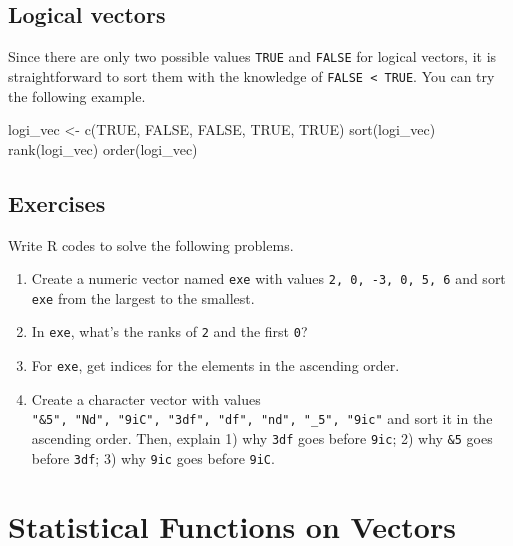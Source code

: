 \documentclass[
]{book}
\newenvironment{Shaded}{\begin{snugshade}}{\end{snugshade}}
\newcommand{\ConstantTok}[1]{\textcolor[rgb]{0.00,0.00,0.00}{#1}}
\newcommand{\FunctionTok}[1]{\textcolor[rgb]{0.00,0.00,0.00}{#1}}
\newcommand{\NormalTok}[1]{#1}
\newcommand{\OtherTok}[1]{\textcolor[rgb]{0.56,0.35,0.01}{#1}}
\begin{document}
\hypertarget{logical-vectors}{%
\subsection{Logical vectors}\label{logical-vectors}}

Since there are only two possible values \texttt{TRUE} and \texttt{FALSE} for logical vectors, it is straightforward to sort them with the knowledge of \texttt{FALSE\ \textless{}\ TRUE}. You can try the following example.

\begin{Shaded}
\begin{Highlighting}[]
\NormalTok{logi\_vec }\OtherTok{\textless{}{-}} \FunctionTok{c}\NormalTok{(}\ConstantTok{TRUE}\NormalTok{, }\ConstantTok{FALSE}\NormalTok{, }\ConstantTok{FALSE}\NormalTok{, }\ConstantTok{TRUE}\NormalTok{, }\ConstantTok{TRUE}\NormalTok{)}
\FunctionTok{sort}\NormalTok{(logi\_vec)}
\FunctionTok{rank}\NormalTok{(logi\_vec)}
\FunctionTok{order}\NormalTok{(logi\_vec)}
\end{Highlighting}
\end{Shaded}

\hypertarget{exercises-6}{%
\subsection{Exercises}\label{exercises-6}}

Write R codes to solve the following problems.

\begin{enumerate}
\def\labelenumi{\arabic{enumi}.}
\item
  Create a numeric vector named \texttt{exe} with values \texttt{2,\ 0,\ -3,\ 0,\ 5,\ 6} and sort \texttt{exe} from the largest to the smallest.
\item
  In \texttt{exe}, what's the ranks of \texttt{2} and the first \texttt{0}?
\item
  For \texttt{exe}, get indices for the elements in the ascending order.
\item
  Create a character vector with values \texttt{"\&5",\ "Nd",\ "9iC",\ "3df",\ "df",\ "nd",\ "\_5",\ "9ic"} and sort it in the ascending order. Then, explain 1) why \texttt{3df} goes before \texttt{9ic}; 2) why \texttt{\&5} goes before \texttt{3df}; 3) why \texttt{9ic} goes before \texttt{9iC}.
\end{enumerate}

\hypertarget{vector-functions}{%
\section{Statistical Functions on Vectors}\label{vector-functions}}
\end{document}
